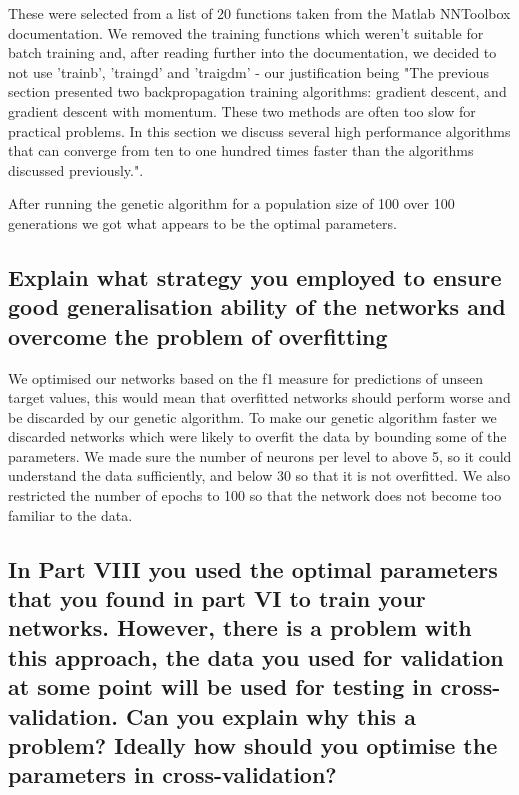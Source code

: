 \documentclass[11pt]{article}
\begin{document}
These were selected from a list of 20 functions taken from the Matlab NNToolbox documentation. We removed the training functions which weren't suitable for batch training and, after reading further into the documentation, we decided to not use 'trainb', 'traingd' and 'traigdm' - our justification being "The previous section presented two backpropagation training algorithms: gradient descent, and gradient descent with momentum. These two methods are often too slow for practical problems. In this section we discuss several high performance algorithms that can converge from ten to one hundred times faster than the algorithms discussed previously.".

After running the genetic algorithm for a population size of 100 over 100 generations we got 
what appears to be the optimal parameters.





\subsection{Explain what strategy you employed to ensure good generalisation ability of the networks and overcome the problem of overfitting}

We optimised our networks based on the f1 measure for predictions of unseen target values, this would mean that overfitted networks should perform worse and be discarded by our genetic algorithm. To make our genetic algorithm faster we discarded networks which were likely to overfit the data by bounding some of the parameters. We made sure the number of neurons per level to above 5, so it could understand the data sufficiently, and below 30 so that it is not overfitted. We also restricted the number of epochs to 100 so that the network does not become too familiar to the data. 

\subsection{In Part VIII you used the optimal parameters that you found in part VI to train your networks. However, there is a problem with this approach, the data you used for validation at some point will be used for testing in cross-validation. Can you explain why this a problem? Ideally how should you optimise the parameters in cross-validation?}
\end{document}
